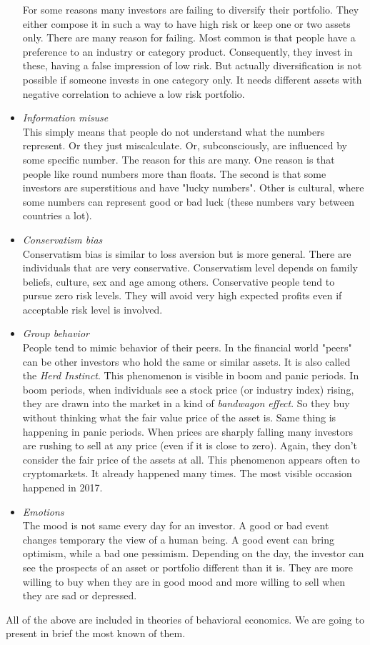 \documentclass{article}
\begin{document}
\begin{itemize}
For some reasons many investors are failing to diversify their portfolio. They either compose it in such a way to have high risk or keep one or two assets only. There are many reason for failing. Most common is that people have a preference to an industry or category product. Consequently, they invest in these, having a false impression of low risk. But actually diversification is not possible if someone invests in one category only. It needs different assets with negative correlation to achieve a low risk portfolio.
\item \emph{Information misuse}\\
This simply means that people do not understand what the numbers represent. Or they just miscalculate. Or, subconsciously, are influenced by some specific number. The reason for this are many. One reason is that people like round numbers more than floats. The second is that some investors are superstitious and have "lucky numbers". Other is cultural, where some numbers can represent good or bad luck (these numbers vary between countries a lot). 
\item \emph{Conservatism bias}\\
Conservatism bias is similar to loss aversion but is more general. There are individuals that are very conservative. Conservatism level depends on family beliefs, culture, sex and age among others. Conservative people tend to pursue zero risk levels. They will avoid very high expected profits even if acceptable risk level is involved.
\item \emph{Group behavior}\\
People tend to mimic behavior of their peers. In the financial world "peers" can be other investors who hold the same or similar assets. It is also called the \emph{Herd Instinct}. This phenomenon is visible in boom and panic periods. In boom periods, when individuals see a stock price (or industry index) rising, they are drawn into the market in a kind of \emph{bandwagon effect}. So they buy without thinking what the fair value price of the asset is. Same thing is happening in panic periods. When prices are sharply falling many investors are rushing to sell at any price (even if it is close to zero). Again, they don't consider the fair price of the assets at all. This phenomenon appears often to cryptomarkets. It already happened many times. The most visible occasion happened in 2017.
\item \emph{Emotions}\\
The mood is not same every day for an investor. A good or bad event changes temporary the view of a human being. A good event can bring optimism, while a bad one pessimism. Depending on the day, the investor can see the prospects of an asset or portfolio different than it is. They are more willing to buy when they are in good mood and more willing to sell when they are sad or depressed.
\end{itemize}
All of the above are included in theories of behavioral economics. We are going to present in brief the most known of them.
\end{document}
